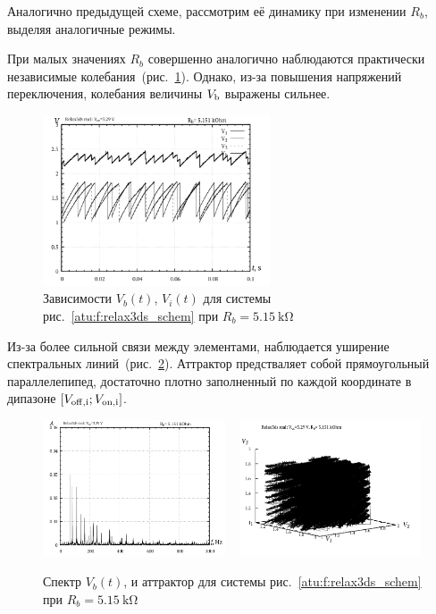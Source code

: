 Аналогично предыдущей схеме, рассмотрим её динамику при
изменении $R_b$, выделяя аналогичные режимы.


При малых
значениях $R_b$
совершенно аналогично наблюдаются практически независимые
колебания~(рис.~\ref{atu:f:relax3ds_t_05151}).
Однако, из-за повышения напряжений переключения,
колебания величины $V_\mathrm{b}$
выражены сильнее.

\begin{figure}[htb!]
  \centerline{\includegraphics[width=0.6\textwidth]{p/relax3ds_t_005151.png} }
  \caption{Зависимости $V_b(t)$, $V_i(t)$ для системы рис.~\ref{atu:f:relax3ds_schem} при $R_b=\SI{5.15}{\kilo\ohm}$ }
  \label{atu:f:relax3ds_t_05151}
\end{figure}


Из-за более сильной связи между элементами,
наблюдается уширение спектральных линий~(рис.~\ref{atu:f:relax3ds_f_05151}).
Аттрактор предстваляет собой прямоугольный параллелепипед, достаточно плотно заполненный по каждой координате в
дипазоне $[ V_\mathrm{off,i} ; V_\mathrm{on,i} ] $.


\begin{figure}[htb!]
  \centerline{
    \includegraphics[width=0.48\textwidth]{p/relax3ds_f_005151.png}
    ~
    \includegraphics[width=0.48\textwidth]{p/relax3ds_v1v2v3_005151.png}
  }
  \caption{Спектр $V_b(t)$, и аттрактор для системы рис.~\ref{atu:f:relax3ds_schem} при $R_b=\SI{5.15}{\kilo\ohm}$ }
  \label{atu:f:relax3ds_f_05151}
\end{figure}

